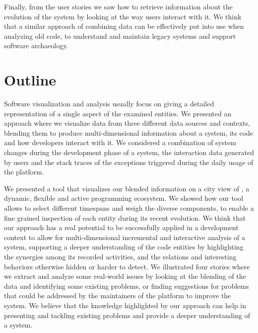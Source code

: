 Finally, from the user stories we saw how to retrieve information about the evolution of the system by looking at the way users interact with it.
We think that a similar approach of combining data can be effectively put into use when analyzing old code, to understand and maintain legacy systems and support software archaeology.



\section{Outline}\label{sec:blend-summary}

Software visualization and analysis usually focus on giving a detailed representation of a single aspect of the examined entities.
We presented an approach where we visualize data from three different data sources and contexts, blending them to produce multi-dimensional information about a system, its code and how developers interact with it.
We considered a combination of system changes during the development phase of a system, the interaction data generated by users and the stack traces of the exceptions triggered during the daily usage of the platform.

We presented a tool that visualizes our blended information on a city view of \pha, a dynamic, flexible and active programming ecosystem.
We showed how our tool allows to select different timespans and weigh the diverse components, to enable a fine grained inspection of each entity during its recent evolution.
We think that our approach has a real potential to be successfully applied in a development context to allow for multi-dimensional incremental and interactive analysis of a system, supporting a deeper understanding of the code entities by highlighting the synergies among its recorded activities, and the relations and interesting behaviors otherwise hidden or harder to detect.
We illustrated four stories where we extract and analyze some real-world issues by looking at the blending of the data and identifying some existing problems, or finding suggestions for problems that could be addressed by the maintainers of the platform to improve the system.
We believe that the knowledge highlighted by our approach can help in presenting and tackling existing problems and provide a deeper understanding of a system.

